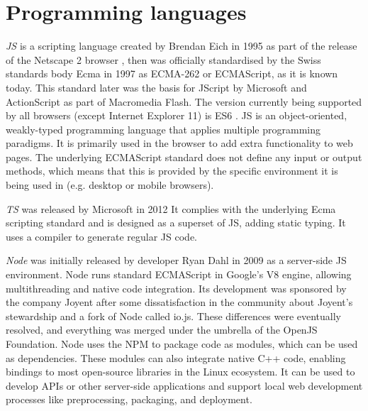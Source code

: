 \section{Programming languages}
\label{section:programmingLanguages}



\emph{\ac{JS}} is a scripting language created by Brendan Eich in 1995 as part of the release of the Netscape 2 browser \parencite{javascriptRelease}, then was officially standardised by the Swiss standards body Ecma in 1997 as ECMA-262 or ECMAScript, as it is known today. This standard later was the basis for JScript by Microsoft and ActionScript as part of Macromedia Flash. The version currently being supported by all browsers (except Internet Explorer 11) is \ac{ES6} \parencite{javascriptHistory}. \ac{JS} is an object-oriented, weakly-typed programming language that applies multiple programming paradigms. It is primarily used in the browser to add extra functionality to web pages. The underlying ECMAScript standard does not define any input or output methods, which means that this is provided by the specific environment it is being used in (e.g. desktop or mobile browsers).

\emph{\ac{TS}} was released by Microsoft in 2012  It complies with the underlying Ecma scripting standard and is designed as a superset of \ac{JS}, adding static typing. It uses a compiler to generate regular \ac{JS} code.

\emph{Node} was initially released by developer Ryan Dahl in 2009 as a server-side \ac{JS} environment. Node runs standard ECMAScript in Google's V8 engine, allowing multithreading and native code integration. Its development was sponsored by the company Joyent after some dissatisfaction in the community about Joyent's stewardship and a fork of Node called io.js. These differences were eventually resolved, and everything was merged under the umbrella of the OpenJS Foundation. Node uses the \ac{NPM} to package code as modules, which can be used as dependencies. These modules can also integrate native C++ code, enabling bindings to most open-source libraries in the Linux ecosystem. It can be used to develop \ac{API}s or other server-side applications and support local web development processes like preprocessing, packaging, and deployment.

